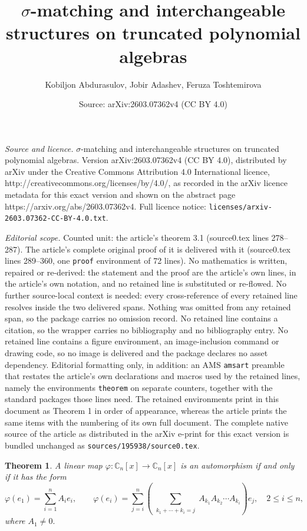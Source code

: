 \documentclass[10pt,a4paper]{amsart}
\title{$\sigma$-matching and interchangeable structures on truncated polynomial algebras}
\author{Kobiljon Abdurasulov, Jobir Adashev, Feruza Toshtemirova}
\date{Source: arXiv:2603.07362v4 (CC BY 4.0)}
\newtheorem{theorem}{Theorem}
\begin{document}
\maketitle

\noindent\emph{Source and licence.} $\sigma$-matching and interchangeable structures on truncated polynomial algebras. Version arXiv:2603.07362v4 (CC BY 4.0), distributed by arXiv under the Creative Commons Attribution 4.0 International licence, http://creativecommons.org/licenses/by/4.0/, as recorded in the arXiv licence metadata for this exact version and shown on the abstract page https://arxiv.org/abs/2603.07362v4. Full licence notice: \texttt{licenses/arxiv-2603.07362-CC-BY-4.0.txt}.\par\smallskip

\noindent\textit{Editorial scope.} Counted unit: the article's theorem 3.1 (source0.tex lines 278--287). The article's complete original proof of it is delivered with it (source0.tex lines 289--360, one \texttt{proof} environment of 72 lines). No mathematics is written, repaired or re-derived: the statement and the proof are the article's own lines, in the article's own notation, and no retained line is substituted or re-flowed.  No further source-local context is needed: every cross-reference of every retained line resolves inside the two delivered spans.  Nothing was omitted from any retained span, so the package carries no omission record.  No retained line contains a citation, so the wrapper carries no bibliography and no bibliography entry.  No retained line contains a figure environment, an image-inclusion command or drawing code, so no image is delivered and the package declares no asset dependency.  Editorial formatting only, in addition: an AMS \texttt{amsart} preamble that restates the article's own declarations and macros used by the retained lines, namely the environments \texttt{theorem} on separate counters, together with the standard packages those lines need.  The retained environments print in this document as Theorem 1 in order of appearance, whereas the article prints the same items with the numbering of its own full document.  The complete native source of the article as distributed in the arXiv e-print for this exact version is bundled unchanged as \texttt{sources/195938/source0.tex}.
	\begin{theorem}\label{3.1}
        A linear map $\varphi: \mathbb{C}_n [x] \to \mathbb{C}_n [x]$ is an automorphism if and only if it has the form
		\begin{equation}\label{Aut}
			\varphi(e_1 )=\sum_{i=1}^n A_i e_i,
			\qquad
			\varphi(e_i ) = \sum_{j=i}^n \left( \sum_{\substack{k_1 +\cdots+k_i =j}} A_{k_1} A_{k_2} \cdots A_{k_i} \right) e_j, \quad 2 \le i \le n,
		\end{equation}
		where $A_1 \ne 0.$
	\end{theorem}
\end{document}
